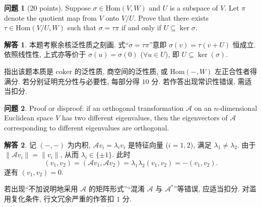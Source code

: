 \documentclass{MainStyle}
\theoremstyle{definition}
\newtheorem{problem}{问题}
\newtheorem{solution}{解答}
\begin{document}
\begin{problem}[20 points]
Suppose $\sigma\in \mathrm{Hom}(V,W)$ and $U$ is a subspace of $V$. Let $\pi$ denote the quotient map from $V$ onto $V/U$. Prove that there exists $\tau\in \mathrm{Hom}(V/U,W)$ such that $\sigma=\tau\pi$ if and only if $U\subseteq \ker\sigma$.
\end{problem}

\begin{solution}
    本题考察余核泛性质之刻画. 式``$\sigma=\tau\pi$''意即 $\sigma(v)=\tau(v+U)$ 恒成立. 依照线性性, 上式亦等价于 $\sigma(u)=\sigma(0)$ ($\forall u\in U$), 即 $U\subseteq \ker(\sigma)$.
\end{solution}

\begin{evaluation}
    指出该题本质是 $\mathrm{coker}$ 的泛性质, 商空间的泛性质, 或 $\mathrm{Hom}(-,W)$ 左正合性者得满分. 若分别证明充分性与必要性, 每部分得 $10$ 分. 若作答出现常识性错误, 需适当扣分.
\end{evaluation}

\begin{problem}
Proof or disproof: if an orthogonal transformation $\mathscr A$ on an $n$-dimensional Euclidean space $V$ has two different eigenvalues, then the eigenvectors of $\mathscr A$ corresponding to different eigenvalues are orthogonal.
\end{problem}

\begin{solution}
    记 $(-,-)$ 为内积, $\mathscr Av_i=\lambda_i v_i$ 是特征向量 ($i=1,2$), 满足 $\lambda_1\neq \lambda _2$. 由于 $\|\mathscr A v_i\|=\|v_i\|$, 从而 $\lambda_i\in \{\pm 1\}$. 此时
    \begin{equation*}
        (v_1,v_2)=(\mathscr Av_1,\mathscr Av_2)=\lambda_1\lambda_2 (v_1,v_2)=-(v_1,v_2).
    \end{equation*}
    遂有 $(v_1,v_2)=0$.
\end{solution}

\begin{evaluation}
    若出现``不加说明地采用 $\mathscr A$ 的矩阵形式''``混淆 $\mathscr A$ 与 $\mathscr A^\ast$''等错误, 应适当扣分. 对滥用复化条件, 行文冗余严重的作答扣 $1$ 分.
\end{evaluation}
\end{document}
